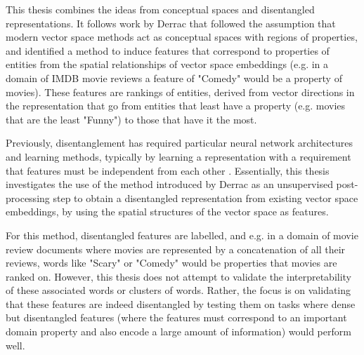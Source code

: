 

This thesis combines the ideas from conceptual spaces and disentangled representations. It follows work by Derrac \cite{Derrac2015} that followed the assumption that modern vector space methods act as conceptual spaces with regions of properties, and  identified a method to induce features that correspond to properties of entities from the spatial relationships of vector space embeddings (e.g. in a domain of IMDB movie reviews a feature of "Comedy" would be a property of movies).  These features are rankings of entities, derived from vector directions in the representation that go from entities that least have a property (e.g. movies that are the least "Funny") to those that  have it the most. 

Previously, disentanglement has required particular  neural network architectures and learning methods, typically by learning a representation with a requirement that features must be independent from each other \cite{Banner}  \cite{Paige2016}.  Essentially, this thesis investigates the use of the method introduced by Derrac \cite{Derrac2015} as an unsupervised post-processing step to obtain a disentangled representation from existing vector space embeddings, by using the spatial structures of the vector space as features.

For this method, disentangled features are labelled, and e.g. in a domain of movie review documents where movies are represented by a concatenation of all their reviews, words like "Scary" or "Comedy" would be properties that movies are ranked on. However, this thesis does not attempt to validate the interpretability of these associated words or clusters of words. Rather, the focus is on validating that these features are indeed disentangled by testing them on tasks where dense but disentangled features (where the features must correspond to an important domain property and also  encode a large amount of information) would perform well. 






